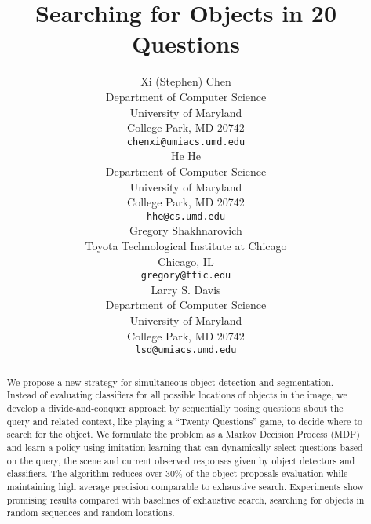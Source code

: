 \documentclass{article} %
\title{Searching for Objects in 20 Questions}
\author{
Xi (Stephen) Chen\\
Department of Computer Science\\
University of Maryland\\
College Park, MD 20742 \\
\texttt{chenxi@umiacs.umd.edu} \\
\AND
He He \\
Department of Computer Science\\
University of Maryland\\
College Park, MD 20742 \\
\texttt{hhe@cs.umd.edu} \\
\And
Gregory Shakhnarovich\\
Toyota Technological Institute at Chicago \\
Chicago, IL\\
\texttt{gregory@ttic.edu} \\
\And
Larry S. Davis \\
Department of Computer Science\\
University of Maryland\\
College Park, MD 20742 \\
\texttt{lsd@umiacs.umd.edu} 
}
\begin{document}
\maketitle

\begin{abstract}
We propose a new strategy for simultaneous object detection and segmentation. Instead of evaluating classifiers for all possible locations of objects in the
image, we develop a divide-and-conquer approach by sequentially posing questions about the query and related context, like playing a ``Twenty Questions'' game, to decide where to search for the object. We formulate the problem as a Markov Decision Process (MDP) and learn a policy using imitation learning that can dynamically select questions based on the query, the scene and current observed responses given by object detectors and classifiers. The algorithm reduces over 30\% of the object proposals evaluation while maintaining high average precision comparable to exhaustive search. Experiments show promising results compared with baselines of exhaustive search, searching for objects in random sequences and random locations.
\end{abstract}



% 


% 






{\small


}
\end{document}
